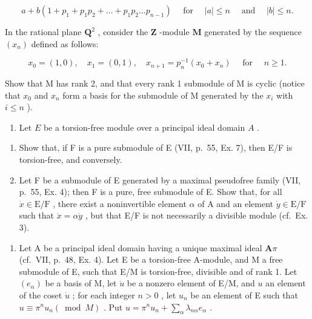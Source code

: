 \[
a + b \left(1 + p _ {1} + p _ {1} p _ {2} + \dots + p _ {1} p _ {2} \dots p _ {n - 1}\right) \quad \text { for } \quad | a | \leqslant n \quad \text { and } \quad | b | \leqslant n.
\]

In the rational plane \(\mathbf{Q}^2\) , consider the \(\mathbf{Z}\) -module \(\mathbf{M}\) generated by the sequence \((x_n)\) defined as follows:

\[
x _ {0} = (1, 0), \quad x _ {1} = (0, 1), \quad x _ {n + 1} = p _ {n} ^ {- 1} \left(x _ {0} + x _ {n}\right) \quad \text { for } \quad n \geqslant 1.
\]

Show that M has rank 2, and that every rank 1 submodule of M is cyclic (notice that \(x_{0}\) and \(x_{n}\) form a basis for the submodule of M generated by the \(x_{i}\) with \(i \leqslant n\) ).

\begin{enumerate}
\def\labelenumi{\arabic{enumi})}
\setcounter{enumi}{3}
\tightlist
\item
  Let \(E\) be a torsion-free module over a principal ideal domain \(A\) .
\end{enumerate}

\begin{enumerate}
\def\labelenumi{\alph{enumi})}
\item
  Show that, if F is a pure submodule of E (VII, p.~55, Ex. 7), then E/F is torsion-free, and conversely.
\item
  Let F be a submodule of E generated by a maximal pseudofree family (VII, p.~55, Ex. 4); then F is a pure, free submodule of E. Show that, for all \(\dot{x} \in \mathrm{E} / \mathrm{F}\) , there exist a noninvertible element \(\alpha\) of A and an element \(\dot{y} \in \mathrm{E} / \mathrm{F}\) such that \(\dot{x} = \alpha \dot{y}\) , but that E/F is not necessarily a divisible module (cf.~Ex. 3).
\end{enumerate}

\begin{enumerate}
\def\labelenumi{\arabic{enumi})}
\setcounter{enumi}{4}
\tightlist
\item
  Let A be a principal ideal domain having a unique maximal ideal \(\mathbf{A}\pi\) (cf.~VII, p.~48, Ex. 4). Let E be a torsion-free A-module, and M a free submodule of E, such that E/M is torsion-free, divisible and of rank 1. Let \((e_{\alpha})\) be a basis of M, let \(\dot{u}\) be a nonzero element of E/M, and \(u\) an element of the coset \(\dot{u}\) ; for each integer \(n > 0\) , let \(u_{n}\) be an element of E such that \(u \equiv \pi^{n} u_{n} (\bmod M)\) . Put \(u = \pi^{n} u_{n} + \sum_{\alpha} \lambda_{n\alpha} e_{\alpha}\) .
\end{enumerate}


